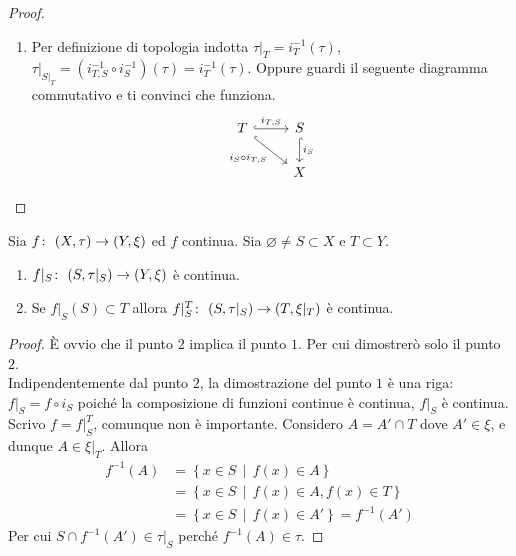 \begin{proof}
\begin{enumerate}
\begin{proof}
	\end{proof} 
	\begin{proof}
		Dimostro prima che $\bar{W}^{\tau|_S} \subset \bar{W}^\tau \cap S$. $W \subset \bar{W}^\tau \cap S$ poiché $W \subset S$. Inoltre $\bar{W}^\tau \cap S$ è un chiuso in $\tau|_S$, quindi per la definizione di chiusura (e la sua minimalità), dev'essere che $\bar{W}^{\tau|_S} \subset \bar{W}^\tau \cap S$.
		Dimostro $ \bar{W}^\tau \cap S\subset \bar{W}^{\tau|_S}$. Per il punto $2$ esiste un chiuso $C$ di $\tau$ tale che $C \cap S = \bar{W}^{\tau|_S}$. Per cui $W \subset C$ e per l'ipotesi di minimalità della chiusura ho anche che $\bar{W}^\tau \subset C$, e segue $\bar{W}^\tau \cap S \subset C \cap S = \bar{W}^{\tau|_S}$.
	\end{proof}
	\item 
		Per definizione di topologia indotta $\tau|_T = i^{-1}_T(\tau)$, $\tau|_{S|_T} = (i^{-1}_{T,S} \circ i^{-1}_{S}) (\tau) = i^{-1}_T(\tau)$. Oppure guardi il seguente diagramma commutativo e ti convinci che funziona.
		\begin{equation*}
		\begin{tikzcd}
				T \arrow[hook]{r}{i_{T,S}} \arrow[hook,swap]{rd}{i_{S} \circ i_{T,S}} & S \arrow[hook]{d}{i_S} \\
																							 & X
		\end{tikzcd}
		\end{equation*}	
\end{enumerate}
\end{proof}


\begin{theorem}
	Sia $f \colon\ (X,\tau) \rightarrow (Y,\xi)$ ed $f$ continua. Sia $\varnothing \neq S \subset X$ e $T \subset Y$.
	\begin{enumerate}
		\item $f|_S \colon\ (S, \tau|_S) \rightarrow (Y, \xi)$ è continua.
		\item Se $f|_S(S) \subset T$ allora $f|^T_S \colon\ (S, \tau|_S) \rightarrow (T, \xi|_T)$ è continua.
	\end{enumerate}
\end{theorem}
\begin{proof}
	È ovvio che il punto $2$ implica il punto $1$. Per cui dimostrerò solo il punto $2$. \\ Indipendentemente dal punto $2$, la dimostrazione del punto $1$ è una riga: $f|_S = f \circ i_S$ poiché la composizione di funzioni continue è continua, $f|_S$ è continua.\\
	
	Scrivo $f = f|^T_S$, comunque non è importante. Considero $A = A' \cap T$ dove $A' \in \xi$, e dunque $A \in \xi|_T$. Allora 
	\begin{align*}
		f^{-1}(A) & = \left\{x \in  S \,\middle|\, f(x) \in A \right\} \\
					  & = \left\{x \in  S \,\middle|\, f(x) \in A , f(x) \in T \right\} \\
					  & =  \left\{x \in  S \,\middle|\, f(x) \in A'\right\} = f^{-1}(A')
	\end{align*}
	Per cui $S \cap f^{-1}(A') \in \tau|_S$ perché $f^{-1}(A) \in \tau$.
\end{proof}

